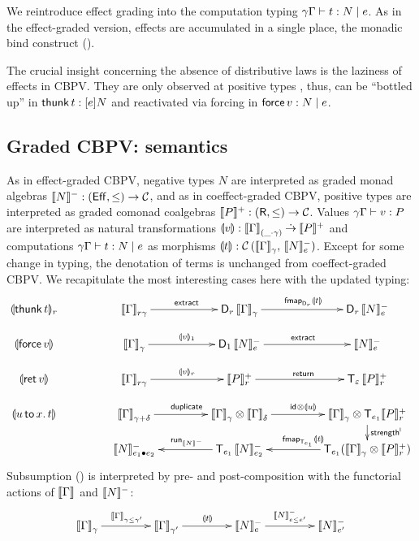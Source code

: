\documentclass[acmsmall,review,anonymous]{acmart}\settopmatter{printfolios=true,printccs=false,printacmref=false}
\begin{document}
We reintroduce effect grading into the computation typing
$\qeCompTy \gamma \Gamma t e N$.  As in the effect-graded version,
effects are accumulated in a single place, the monadic bind construct
(\relim\diamond).

The crucial insight concerning the absence of distributive laws is the
laziness of effects in CBPV.  They are only observed at positive
types \citep{levy:hosc06},
thus, can be ``bottled up'' in $\thunk t : \thunkty e N$ and
reactivated via forcing in $\force v : N \mid e$.


\subsection{Graded CBPV: semantics}

As in effect-graded CBPV, negative types $N$ are interpreted as graded
monad algebras $\denn N : (\Eff,\leq) \to \CC$, and as in
coeffect-graded CBPV, positive types are interpreted as graded comonad
coalgebras $\denp P : (\R,\leq) \to \CC$.  Values
$\qValTy \gamma \Gamma v P$ are interpreted as natural transformations
$\dent v : \Denpar \Gamma {\_\cdot\gamma} \todot \denp P$ and
computations $\qeCompTy \gamma \Gamma t e N$ as morphisms
$\dent t : \Hom {\Den\Gamma \gamma} {\Denn N e}$.  Except for some
change in typing, the denotation of terms is unchanged from
coeffect-graded CBPV.  We recapitulate the most interesting cases here
with the updated typing:
\[
\xymatrix@C=10ex@R=3ex{
\denv {\thunk t} r
& \Den \Gamma {r\gamma}     \ar[r]^{\extract}
& \D[r]\,\Den\Gamma\gamma   \ar[r]^{\fmapt[{\D[r]}]{\dent t}}
& \D[r]\,\Denn N e
\\
\dent {\force v}
& \Den \Gamma \gamma    \ar[r]^{\denv v 1}
& \D[1]\,\Denn N e      \ar[r]^{\extract}
& \Denn N e
\\
\dent {\ret v}
& \Den \Gamma {r\gamma}  \ar[r]^{\denv v r}
& \Denp P r              \ar[r]^{\treturn}
& \T[\Ge]\,\Denp P r
\\
\dent {\bind x u t}
& \Den \Gamma {\gamma + \delta}                 \ar[r]^{\duplicate}
& \Den \Gamma \gamma \otimes \Den \Gamma \delta \ar[r]^{\tid \otimes \dent u}
& \Den \Gamma \gamma \otimes \T[e_1] \Denp P r  \ar[d]^{\strengthl}
\\
& \Denn N {e_1 \bu e_2}
& \T[e_1]\,\Denn N {e_2}                        \ar[l]_{\run[\denn N]}
& \T[e_1](\Den \Gamma \gamma \otimes \Denp P r) \ar[l]_{\fmapt[{\T[e_1]}] {\dent t}}
}
\]
Subsumption (\rsub) is interpreted by pre- and post-composition with
the functorial actions of $\den \Gamma$ and $\denn N$:
\[
\xymatrix@C=10ex{
\Den \Gamma {\gamma}   \ar[r]^{\Den\Gamma{\gamma \leq \gamma'}}
& \Den \Gamma {\gamma'}  \ar[r]^{\dent t}
& \Denn N e              \ar[r]^{\Denn N {e \leq e'}}
& \Denn N {e'}
}
\]
\end{document}
